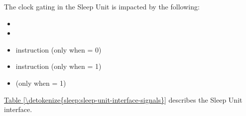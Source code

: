 \documentclass[letterpaper,10pt,english]{sphinxmanual}
\begin{document}
\sphinxAtStartPar
The clock gating in the Sleep Unit is impacted by the following:
\begin{itemize}
\item {} 
\sphinxAtStartPar
{}

\item {} 
\sphinxAtStartPar
{}

\item {} 
\sphinxAtStartPar
{} instruction (only when  = 0)

\item {} 
\sphinxAtStartPar
{} instruction (only when  = 1)

\item {} 
\sphinxAtStartPar
{} (only when  = 1)

\end{itemize}

\sphinxAtStartPar
\hyperref[\detokenize{sleep:sleep-unit-interface-signals}]{Table \ref{\detokenize{sleep:sleep-unit-interface-signals}}} describes the Sleep Unit interface.
\end{document}
